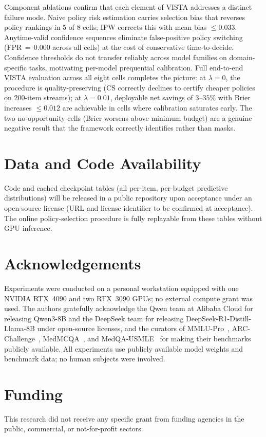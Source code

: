 \documentclass[a4paper,fleqn]{cas-sc}
\theoremstyle{plain}
\theoremstyle{definition}
\theoremstyle{remark}
\begin{document}
Component ablations confirm that each element of VISTA addresses a distinct
failure mode. Naive policy risk estimation carries selection bias that reverses
policy rankings in 5 of 8 cells; IPW corrects this with mean bias $\leq 0.033$.
Anytime-valid confidence sequences eliminate false-positive policy switching
(FPR\,${=}\,0.000$ across all cells) at the cost of conservative time-to-decide.
Confidence thresholds do not transfer reliably across model families on
domain-specific tasks, motivating per-model prequential calibration.
Full end-to-end VISTA evaluation across all eight cells completes the picture:
at $\lambda{=}0$, the procedure is quality-preserving (CS correctly declines to
certify cheaper policies on 200-item streams); at $\lambda{=}0.01$,
deployable net savings of $3$--$35\%$ with Brier increases $\leq 0.012$ are
achievable in cells where calibration saturates early.
The two no-opportunity cells (Brier worsens above minimum budget) are a genuine
negative result that the framework correctly identifies rather than masks.

\section*{Data and Code Availability}
Code and cached checkpoint tables (all per-item, per-budget predictive
distributions) will be released in a public repository upon acceptance under
an open-source license (URL and license identifier to be confirmed at
acceptance).
The online policy-selection procedure is fully replayable from these tables
without GPU inference.

\section*{Acknowledgements}
Experiments were conducted on a personal workstation equipped with one
NVIDIA RTX~4090 and two RTX~3090 GPUs; no external compute grant was
used.
The authors gratefully acknowledge the Qwen team at Alibaba Cloud for
releasing Qwen3-8B and the DeepSeek team for releasing
DeepSeek-R1-Distill-Llama-8B under open-source licenses, and the curators
of MMLU-Pro~\cite{wang2024mmlu}, ARC-Challenge~\cite{clark2018arc},
MedMCQA~\cite{pal2022medmcqa}, and MedQA-USMLE~\cite{jin2021medqa}
for making their benchmarks publicly available.
All experiments use publicly available model weights and benchmark data;
no human subjects were involved.

\section*{Funding}
This research did not receive any specific grant from funding agencies in
the public, commercial, or not-for-profit sectors.
\end{document}

